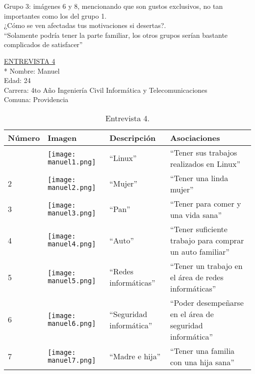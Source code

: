 Grupo 3: imágenes 6 y 8, mencionando que son gustos exclusivos, no tan importantes como los del grupo 1.\\

¿Cómo se ven afectadas tus motivaciones si desertas?.\\

``Solamente podría tener la parte familiar, los otros grupos serían bastante complicados de satisfacer''\\
\newpage

\underline {ENTREVISTA 4} \\*
Nombre: Manuel\\
Edad: 24\\
Carrera: 4to Año Ingeniería Civil Informática y Telecomunicaciones\\
Comuna: Providencia\\

\begin{table}[H]
\centering
\begin{tabular}{>{\centering\arraybackslash}m{1cm} >{\centering\arraybackslash}m{2cm} >{\arraybackslash}m{5cm}>{\arraybackslash}m{5cm}}
\hline
Número & Imagen & Descripción & Asociaciones \\
\hline \hline

1 & \texttt{[image: manuel1.png]} & ``Linux'' & ``Tener sus trabajos realizados en Linux''\\
\hline

2 & \texttt{[image: manuel2.png]} & ``Mujer'' & ``Tener una linda mujer''\\
\hline

3 & \texttt{[image: manuel3.png]} & ``Pan'' & ``Tener para comer y una vida sana'' \\
\hline

4 & \texttt{[image: manuel4.png]} & ``Auto'' & ``Tener suficiente trabajo para comprar un auto familiar'' \\
\hline

5 & \texttt{[image: manuel5.png]} & ``Redes informáticas'' & ``Tener un trabajo en el área de redes informáticas'' \\
\hline

6 & \texttt{[image: manuel6.png]} & ``Seguridad informática'' & ``Poder desempeñarse en el área de seguridad informática'' \\
\hline

7 & \texttt{[image: manuel7.png]} & ``Madre e hija'' & ``Tener una familia con una hija sana'' \\
\hline

\end{tabular}
\caption{Entrevista 4.}
\label{tabla:manuel}
\end{table}

